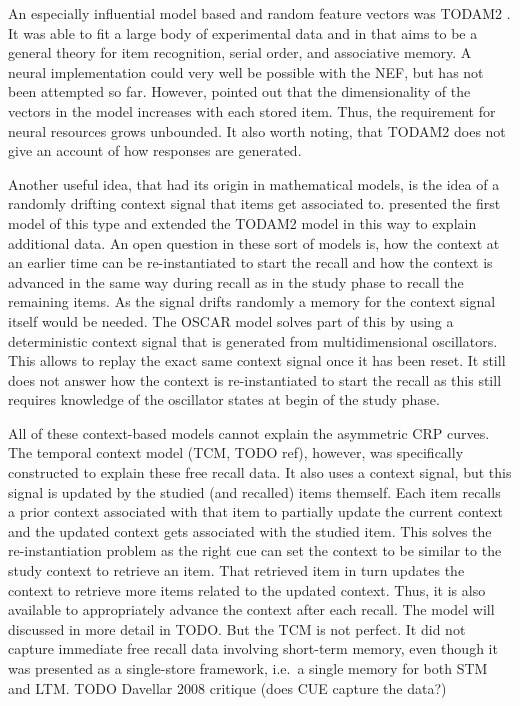 An especially influential model based and random feature vectors was TODAM2 \parencite{Murdock1993}.
It was able to fit a large body of experimental data and in that aims to be a general theory for item recognition, serial order, and associative memory.
A neural implementation could very well be possible with the NEF, but has not been attempted so far.
However, \textcite{Choo2010} pointed out that the dimensionality of the vectors in the model increases with each stored item.
Thus, the requirement for neural resources grows unbounded.
It also worth noting, that TODAM2 does not give an account of how responses are generated.

Another useful idea, that had its origin in mathematical models, is the idea of a randomly drifting context signal that items get associated to.
\Textcite{Estes1955} presented the first model of this type and \textcite{Murdock1997} extended the TODAM2 model in this way to explain additional data.
An open question in these sort of models is, how the context at an earlier time can be re-instantiated to start the recall and how the context is advanced in the same way during recall as in the study phase to recall the remaining items.
As the signal drifts randomly a memory for the context signal itself would be needed.
The OSCAR model \parencite{Brown2000} solves part of this by using a deterministic context signal that is generated from multidimensional oscillators.
This allows to replay the exact same context signal once it has been reset.
It still does not answer how the context is re-instantiated to start the recall as this still requires knowledge of the oscillator states at begin of the study phase.

All of these context-based models cannot explain the asymmetric CRP curves.
The temporal context model (TCM, TODO ref), however, was specifically constructed to explain these free recall data.
It also uses a context signal, but this signal is updated by the studied (and recalled) items themself.
Each item recalls a prior context associated with that item to partially update the current context and the updated context gets associated with the studied item.
This solves the re-instantiation problem as the right cue can set the context to be similar to the study context to retrieve an item.
That retrieved item in turn updates the context to retrieve more items related to the updated context.
Thus, it is also available to appropriately advance the context after each recall.
The model will discussed in more detail in TODO\@.
But the TCM is not perfect.
It did not capture immediate free recall data involving short-term memory, even though it was presented as a single-store framework, i.e.\ a single memory for both STM and LTM\@.
TODO Davellar 2008 critique (does CUE capture the data?)




